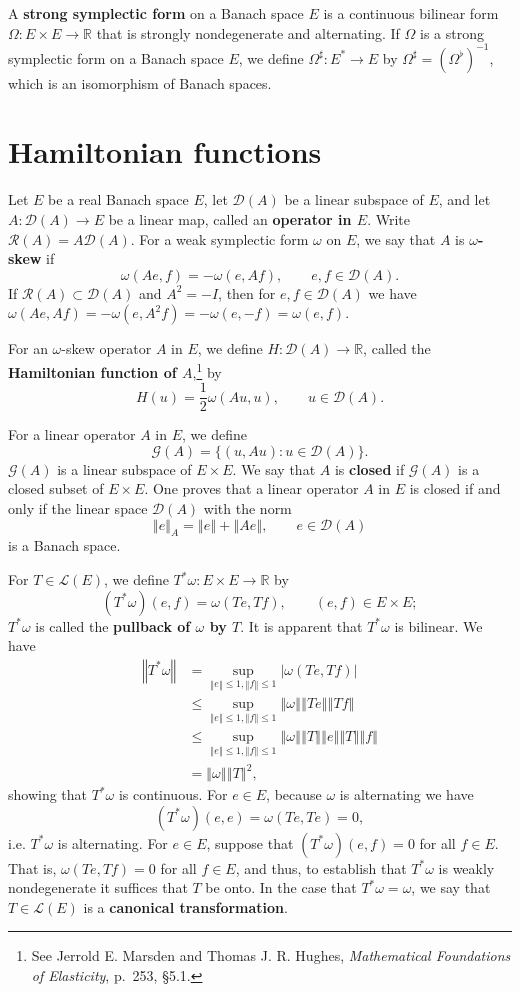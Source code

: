 \documentclass{article}
\newcommand{\norm}[1]{\left\Vert #1 \right\Vert}
\theoremstyle{definition}
\begin{document}
A \textbf{strong symplectic form} on a Banach space $E$ is a continuous bilinear form
$\Omega:E \times E \to \mathbb{R}$ that is
strongly nondegenerate and  alternating. If $\Omega$ is a strong symplectic form on a Banach space $E$, we define
$\Omega^\sharp:E^* \to E$ by $\Omega^\sharp = (\Omega^\flat)^{-1}$, which is an isomorphism of Banach spaces.




\section{Hamiltonian functions}
Let $E$ be a  real Banach space $E$, let $\mathscr{D}(A)$ be a linear subspace of $E$, and let
$A:\mathscr{D}(A) \to E$ be a linear map, called an \textbf{operator in $E$}. Write
$\mathscr{R}(A)=A \mathscr{D}(A)$.
For a weak symplectic form $\omega$ on $E$, we say that $A$ is \textbf{$\omega$-skew} if
\[
\omega(Ae,f) = -\omega(e,Af), \qquad e,f \in \mathscr{D}(A).
\]
If $\mathscr{R}(A) \subset \mathscr{D}(A)$ and $A^2=-I$, then for $e,f \in \mathscr{D}(A)$ we have
$\omega(Ae,Af)=-\omega(e,A^2f)=-\omega(e,-f)=\omega(e,f)$. 

For an $\omega$-skew operator $A$ in $E$, we define $H:\mathscr{D}(A) \to \mathbb{R}$,
called the \textbf{Hamiltonian function of $A$},\footnote{See Jerrold E. Marsden and Thomas J. R. Hughes, {\em Mathematical Foundations of Elasticity}, p.~253, \S 5.1.}
 by
\[
H(u) = \frac{1}{2}\omega(Au,u), \qquad u \in \mathscr{D}(A).
\]

For a linear operator $A$ in $E$, we define 
\[
\mathscr{G}(A) = \{(u,Au): u \in \mathscr{D}(A)\}.
\]
$\mathscr{G}(A)$ is a linear subspace of $E \times E$. We say that
$A$ is \textbf{closed} if $\mathscr{G}(A)$ is a closed subset of $E \times E$. 
One proves that a linear operator $A$ in $E$ is closed if and only if 
the linear space $\mathscr{D}(A)$ with the norm
\[
\norm{e}_A = \norm{e}+\norm{Ae}, \qquad e \in \mathscr{D}(A)
\]
is a Banach space. 

For $T \in \mathscr{L}(E)$, we define $T^*\omega:E \times E \to \mathbb{R}$ by
\[
(T^*\omega)(e,f) = \omega(Te,Tf), \qquad (e,f) \in E \times E;
\]
 $T^*\omega$ is called the \textbf{pullback of $\omega$ by $T$}. It is apparent that $T^*\omega$ is  bilinear.
 We have
 \begin{align*}
 \norm{T^*\omega}&=\sup_{\norm{e} \leq 1, \norm{f} \leq 1}
 |\omega(Te,Tf)|\\
 &\leq \sup_{\norm{e} \leq 1, \norm{f} \leq 1} \norm{\omega} \norm{Te} \norm{Tf}\\
 &\leq \sup_{\norm{e} \leq 1, \norm{f} \leq 1} \norm{\omega} \norm{T} \norm{e}
 \norm{T} \norm{f}\\
 &=\norm{\omega} \norm{T}^2,
 \end{align*}
 showing that $T^*\omega$ is continuous. For $e \in E$, because $\omega$ is alternating we have
 \[
 (T^*\omega)(e,e) = \omega(Te,Te) = 0,
 \]
 i.e. $T^*\omega$ is alternating. 
 For $e \in E$, suppose that $(T^*\omega)(e,f)=0$ for all $f \in E$. That is,
 $\omega(Te,Tf)=0$ for all $f \in E$, and thus, to establish that $T^*\omega$ is weakly nondegenerate it suffices that
 $T$ be onto. In the case that $T^*\omega = \omega$, we say that $T \in \mathscr{L}(E)$ is a \textbf{canonical transformation}.
\end{document}
